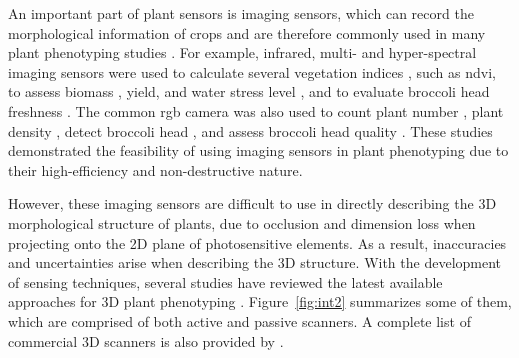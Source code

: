 


An important part of plant sensors is imaging sensors, which can record the morphological information of crops and are therefore commonly used in many plant phenotyping studies \citep{paulus_measuring_2019, feng_comprehensive_2021}. For example, infrared, multi- and hyper-spectral imaging sensors were used to calculate several vegetation indices \citep{han_modeling_2019}, such as \gls{ndvi}, to assess biomass \citep{jimenez-berni_high_2018}, yield, and water stress level \citep{herrero_yield_2020, romano_use_2011}, and to evaluate broccoli head freshness \citep{guo_evaluation_2022}. The common \gls{rgb} camera was also used to count plant number \citep{liu_estimating_2022}, plant density \citep{velumani_estimates_2021}, detect broccoli head \citep{blok_machine_2016}, and assess broccoli head quality \citep{stansell_use_2017}. These studies demonstrated the feasibility of using imaging sensors in plant phenotyping due to their high-efficiency and non-destructive nature.

However, these imaging sensors are difficult to use in directly describing the 3D morphological structure of plants, due to occlusion and dimension loss when projecting onto the 2D plane of photosensitive elements. As a result, inaccuracies and uncertainties arise when describing the 3D structure. With the development of sensing techniques, several studies have reviewed the latest available approaches for 3D plant phenotyping \citep{paulus_measuring_2019, okura_3d_2022, kochi_introduction_2021}. Figure~\ref{fig:int2} summarizes some of them, which are comprised of both active and passive scanners. A complete list of commercial 3D scanners is also provided by \citet[Table 5]{bartol_review_2021}.

